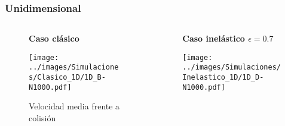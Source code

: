 \documentclass{beamer}
\begin{document}
\begin{frame}[t]
    \frametitle[prueb1]{Unidimensional}
    \begin{columns}
        \hspace{-0.7cm}
        \begin{column}{0.5\textwidth}
            \begin{figure}
                \centering
                \hspace{1.cm}
                \textbf{Caso clásico}\par\medskip
                \vspace{-0.2cm}
                \texttt{[image: ../images/Simulaciones/Clasico\_1D/1D\_B-N1000.pdf]}
                \caption{Velocidad media frente a colisión}
            \end{figure}         
        \end{column}
        \begin{column}{0.5\textwidth}
            \begin{figure}
                \centering 
                \hspace{0.4cm}
                \textbf{Caso inelástico \( \epsilon = 0.7 \)}\par\medskip
                \vspace{-0.23cm}
                \texttt{[image: ../images/Simulaciones/Inelastico\_1D/1D\_D-N1000.pdf]}
            \end{figure}
        \end{column}
    \end{columns}
\end{frame}
\end{document}
